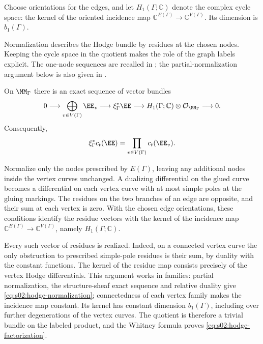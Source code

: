 Choose orientations for the edges, and let $H_1(\Gamma;\mathbb C)$
denote the complex cycle space: the kernel of the oriented incidence
map $\mathbb C^{E(\Gamma)}\to\mathbb C^{V(\Gamma)}$.  Its dimension
is $b_1(\Gamma)$.

Normalization describes the Hodge bundle by residues at the chosen
nodes.  Keeping the cycle space in the quotient makes the role of the
graph labels explicit.  The one-node sequences are recalled in
\cite[\S 1.3, (17)--(18)]{FP00}; the partial-normalization argument
below is also given in \cite[proof of Proposition 4.4, (4.2)--(4.3)]{LX26b}.

\begin{lmm}
\label{lmm:s02:hodge-normalization}
On $\MM_\Gamma$ there is an exact sequence of vector bundles
\begin{equation}
\label{eq:s02:hodge-normalization}
0\longrightarrow\bigoplus_{v\in V(\Gamma)}\EE_v
\longrightarrow\xi_\Gamma^*\EE
\longrightarrow H_1(\Gamma;\mathbb C)\otimes\mathcal O_{\MM_\Gamma}
\longrightarrow0.
\end{equation}
Consequently,
\begin{equation}
\label{eq:s02:hodge-factorization}
\xi_\Gamma^*c_t(\EE)
=\prod_{v\in V(\Gamma)}c_t(\EE_v).
\end{equation}
\end{lmm}

\begin{prf}
Normalize only the nodes prescribed by $E(\Gamma)$, leaving any
additional nodes inside the vertex curves unchanged.  A dualizing
differential on the glued curve becomes a differential on each vertex
curve with at most simple poles at the gluing markings.  The residues
on the two branches of an edge are opposite, and their sum at each
vertex is zero.  With the chosen edge orientations, these
conditions identify the residue vectors with the kernel of the
incidence map
$\mathbb C^{E(\Gamma)}\to\mathbb C^{V(\Gamma)}$, namely
$H_1(\Gamma;\mathbb C)$.

Every such vector of residues is realized.  Indeed, on a connected
vertex curve the only obstruction to prescribed simple-pole residues
is their sum, by duality with the constant functions.  The kernel of
the residue map consists precisely of the vertex Hodge differentials.
This argument works in families: partial normalization, the
structure-sheaf exact sequence and relative duality give
\eqref{eq:s02:hodge-normalization}; connectedness of each vertex
family makes the incidence map constant.  Its kernel has constant
dimension $b_1(\Gamma)$, including over further degenerations of the
vertex curves.  The quotient is therefore a trivial bundle on the
labeled product, and the Whitney formula proves
\eqref{eq:s02:hodge-factorization}.
\end{prf}


